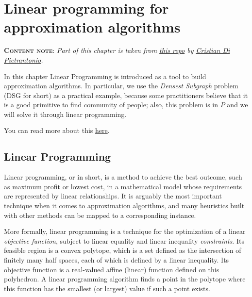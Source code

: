 \chapter{Linear programming for approximation algorithms}

\textbf{\textsc{Content note}}: \emph{Part of this chapter is taken from \href{https://github.com/Halolegend94/uni_social_behavioral_networks/blob/master/chapters/ch05-densest-subgraph.tex}{this repo} by \href{https://github.com/Halolegend94}{Cristian Di Pietrantonio}.}
\vspace{2ex}

In this chapter Linear Programming is introduced as a tool to build approximation algorithms. In particular, we use the \textit{Densest Subgraph} problem (DSG for short) as a practical example, because some practitioners believe that it is a good primitive to find community of people; also, this problem is in $P$ and we will solve it through linear programming.

You can read more about this \href{https://github.com/Halolegend94/uni_social_behavioral_networks/blob/master/main.pdf}{here}.

\section{Linear Programming}

Linear programming, or \lp{} in short, is a method to achieve the best outcome, such as maximum profit or lowest cost, in a mathematical model whose requirements are represented by linear relationships. It is arguably the most important technique when it comes to approximation algorithms, and many heuristics built with other methods can be mapped to a corresponding \lp{} instance.

More formally, linear programming is a technique for the optimization of a linear \emph{objective function}, subject to linear equality and linear inequality \emph{constraints}. Its feasible region is a convex polytope, which is a set defined as the intersection of finitely many half spaces, each of which is defined by a linear inequality. Its objective function is a real-valued affine (linear) function defined on this polyhedron. A linear programming algorithm finds a point in the polytope where this function has the smallest (or largest) value if such a point exists.

